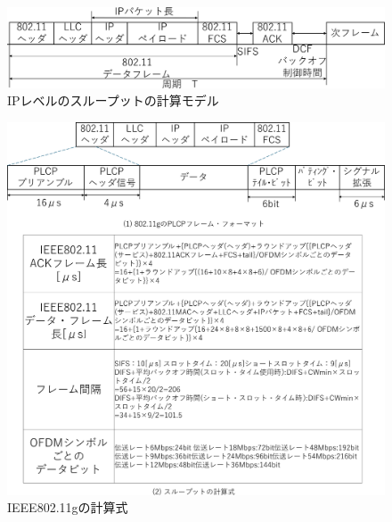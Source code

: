 \documentclass[a4paper,10.5pt]{ltjsarticle}
\begin{document}
\begin{figure}[H]
  \centering
  \includegraphics[width=\linewidth]{11g_packet.pdf} %
  \caption{IPレベルのスループットの計算モデル}
  \label{fig:11g_packet} %
\end{figure}

\clearpage
\begin{figure}[p]
  \centering
  \includegraphics[width=\linewidth]{11g_frameformat.pdf} %
  \caption{IEEE802.11gの計算式}
  \label{fig:11g_frameformat} %
\end{figure}
\clearpage
\end{document}
